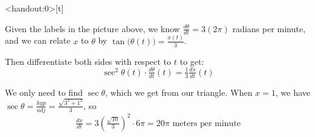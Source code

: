 \begin{frame}<handout:0>[t]
\color{answercolor}
\begin{center}\end{center}\vfill

Given the labels in the picture above, we know $\frac{d\theta}{dt} = 3(2\pi)$ radians per minute, and we can relate $x$ to $\theta$ by $\tan\big(\theta(t)\big)=\frac{x(t)}{3}$. 

\vfill
Then differentiate both sides with respect to $t$ to get:
\[\sec^2\theta(t) \cdot \tfrac{d\theta}{dt}(t) = \tfrac{1}{3}\tfrac{dx}{dt}(t)\] 

\vfill
We only need to find $\sec \theta$, which we get from our triangle.
When $x=1$, we have
$\sec \theta = \frac{hyp}{adj} = \frac{\sqrt{3^2+1^2}}{3}$, so
\[\tfrac{dx}{dt} = 3\left( \tfrac{\sqrt{10}}{3}\right)^2\cdot 6\pi = 20\pi
\text{ meters per minute}\]
\end{frame}
